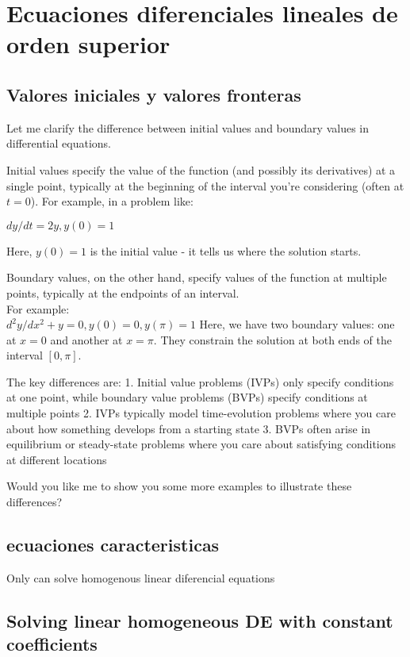 \chapter{Ecuaciones diferenciales lineales de orden superior}

\section{Valores iniciales y valores fronteras}
Let me clarify the difference between initial values and boundary values in differential equations.

Initial values specify the value of the function (and possibly its derivatives) at a single point, typically at the beginning of the interval you're considering (often at $t=0$). For example, in a problem like:

$dy/dt = 2y, y(0) = 1$

Here, $y(0) = 1$ is the initial value - it tells us where the solution starts.

Boundary values, on the other hand, specify values of the function at multiple points, typically at the endpoints of an interval. \\

For example: \\
$d^2y/dx^2 + y = 0, y(0) = 0, y(\pi) = 1$
Here, we have two boundary values: one at $x=0$ and another at $x=\pi$. They constrain the solution at both ends of the interval $[0,\pi]$.

The key differences are:
1. Initial value problems (IVPs) only specify conditions at one point, while boundary value problems (BVPs) specify conditions at multiple points
2. IVPs typically model time-evolution problems where you care about how something develops from a starting state
3. BVPs often arise in equilibrium or steady-state problems where you care about satisfying conditions at different locations

Would you like me to show you some more examples to illustrate these differences?

\section{ecuaciones caracteristicas}
Only can solve homogenous linear diferencial equations

\section{Solving linear homogeneous DE with constant coefficients}

